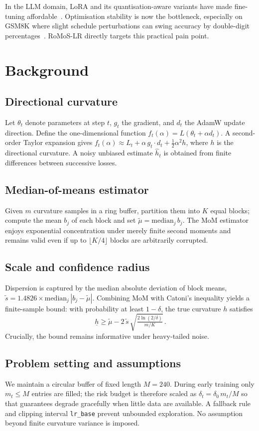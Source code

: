 \documentclass{article} %
\begin{document}
In the LLM domain, LoRA and its quantisation-aware variants have made fine-tuning affordable~\cite{author-year-lora,author-year-qlora}. Optimisation stability is now the bottleneck, especially on GSM8K where slight schedule perturbations can swing accuracy by double-digit percentages~\cite{author-year-careful}. RoMoS-LR directly targets this practical pain point.

\section{Background}\label{sec:background}
\subsection{Directional curvature}
Let \(\theta_t\) denote parameters at step \(t\), \(g_t\) the gradient, and \(d_t\) the AdamW update direction. Define the one-dimensional function \(f_t(\alpha) = L(\theta_t + \alpha d_t)\). A second-order Taylor expansion gives \(f_t(\alpha) \approx L_t + \alpha\, g_t\!\cdot\! d_t + \tfrac{1}{2}\alpha^{2} h\), where \(h\) is the directional curvature. A noisy unbiased estimate \(\hat{h}_t\) is obtained from finite differences between successive losses.

\subsection{Median-of-means estimator}
Given \(m\) curvature samples in a ring buffer, partition them into \(K\) equal blocks; compute the mean \(b_j\) of each block and set \(\tilde{\mu} = \mathrm{median}_j\, b_j\). The MoM estimator enjoys exponential concentration under merely finite second moments and remains valid even if up to \(\lfloor K/4 \rfloor\) blocks are arbitrarily corrupted.

\subsection{Scale and confidence radius}
Dispersion is captured by the median absolute deviation of block means, \(\tilde{s} = 1.4826 \times \mathrm{median}_j\, |b_j - \tilde{\mu}|\). Combining MoM with Catoni's inequality yields a finite-sample bound: with probability at least \(1 - \delta\), the true curvature \(h\) satisfies
\[
\underline{h} \ge \tilde{\mu} - 2\,\tilde{s}\, \sqrt{\tfrac{2 \ln(2/\delta)}{m/K}}\, .
\]
Crucially, the bound remains informative under heavy-tailed noise.

\subsection{Problem setting and assumptions}
We maintain a circular buffer of fixed length \(M = 240\). During early training only \(m_t \le M\) entries are filled; the risk budget is therefore scaled as \(\delta_t = \delta_{0}\, m_t / M\) so that guarantees degrade gracefully when little data are available. A fallback rule and clipping interval \texttt{lr\_base} prevent unbounded exploration. No assumption beyond finite curvature variance is imposed.
\end{document}
